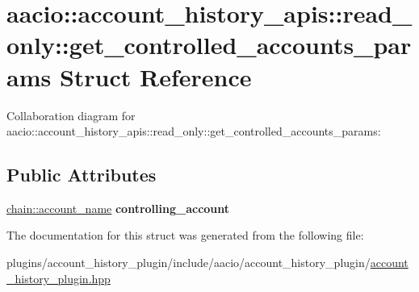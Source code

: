 \hypertarget{structaacio_1_1account__history__apis_1_1read__only_1_1get__controlled__accounts__params}{}\section{aacio\+:\+:account\+\_\+history\+\_\+apis\+:\+:read\+\_\+only\+:\+:get\+\_\+controlled\+\_\+accounts\+\_\+params Struct Reference}
\label{structaacio_1_1account__history__apis_1_1read__only_1_1get__controlled__accounts__params}


Collaboration diagram for aacio\+:\+:account\+\_\+history\+\_\+apis\+:\+:read\+\_\+only\+:\+:get\+\_\+controlled\+\_\+accounts\+\_\+params\+:
\subsection*{Public Attributes}
\begin{DoxyCompactItemize}
\item 
\mbox{\label{structaacio_1_1account__history__apis_1_1read__only_1_1get__controlled__accounts__params_a4595d333337b6532ff6663b74fbc18dc}} 
\mbox{\hyperlink{structaacio_1_1chain_1_1name}{chain\+::account\+\_\+name}} {\bfseries controlling\+\_\+account}
\end{DoxyCompactItemize}


The documentation for this struct was generated from the following file\+:\begin{DoxyCompactItemize}
\item 
plugins/account\+\_\+history\+\_\+plugin/include/aacio/account\+\_\+history\+\_\+plugin/\mbox{\hyperlink{account__history__plugin_8hpp}{account\+\_\+history\+\_\+plugin.\+hpp}}\end{DoxyCompactItemize}
